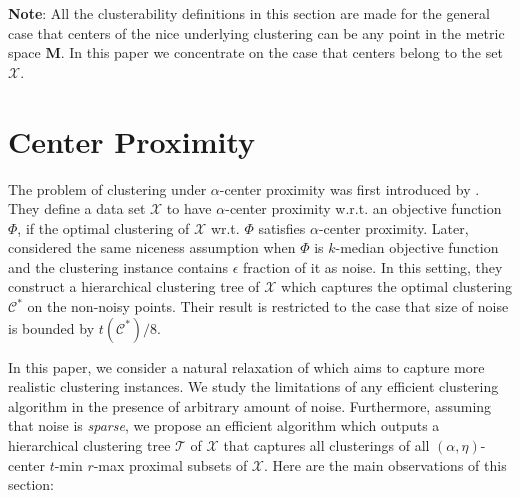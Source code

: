 \documentclass[anon,12pt]{colt2016} %
\newcommand{\mc}{\mathcal}
\newcommand{\mb}{\mathbf}
\begin{document}
\noindent \textbf{Note}: All the clusterability definitions in this section are made for the general case that centers of the nice underlying clustering can be any point in the metric space $\mb M$. In this paper we concentrate on the case that centers belong to the set $\mc X$.
\section{Center Proximity}
\label{section:cp}

The problem of clustering under $\alpha$-center proximity was first introduced by \cite{awasthi2012center}. They define a data set $\mathcal{X}$ to have $\alpha$-center proximity w.r.t. an objective function $\Phi$, if the optimal clustering of $\mc{X}$ wr.t. $\Phi$ satisfies $\alpha$-center proximity.
Later, \cite{balcan2012clustering} considered the same niceness assumption when $\Phi$ is $k$-median objective function and the clustering instance contains $\epsilon$ fraction of it as noise. In this setting, they construct a hierarchical clustering tree of $\mc{X}$ which captures the optimal clustering $\mc{C}^*$ on the non-noisy points. Their result is restricted to the case that size of noise is bounded by $t(\mc{C}^*)/8$.

In this paper, we consider a natural relaxation of \cite{balcan2012clustering} which aims to capture more realistic clustering instances. We study the limitations of any efficient clustering algorithm in the presence of arbitrary amount of noise. Furthermore, assuming that noise is {\em sparse}, we propose an efficient algorithm which outputs a hierarchical clustering tree $\mc T$ of $\mc X$ that captures all clusterings of all $(\alpha, \eta)$-center $t$-min $r$-max proximal subsets of $\mc X$. Here are the main observations of this section:
\end{document}
